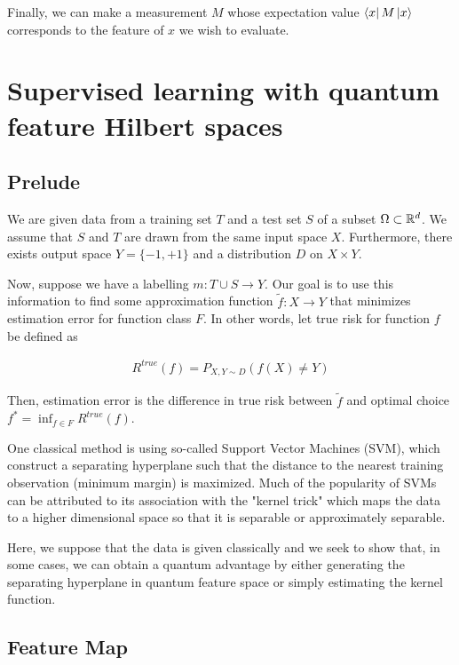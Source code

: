 \documentclass[main.tex]{subfiles}
\begin{document}
Finally, we can make a measurement $M$ whose expectation value $\bra{x}M\ket{x}$ corresponds to the feature of $x$ we wish to evaluate. 

\section{Supervised learning with quantum feature Hilbert spaces}
\cite{havlicek2018supervised}

\subsection{Prelude}

We are given data from a training set $T$ and a test set $S$ of a subset $\Omega \subset \mathbb{R}^d$. We assume that $S$ and $T$ are drawn from the same input space $X$. Furthermore, there exists output space $Y = \{ -1, +1 \} $ and a distribution $D$ on $X \times Y$.

Now, suppose we have a labelling $m: T \cup S \rightarrow Y$.  Our goal is to use this information to find some approximation function $\tilde{f} : X \rightarrow Y$ that minimizes estimation error for function class $F$. In other words, let true risk for function $f$ be defined as

\begin{align*}
R^{true}(f) = P_{X, Y \sim D}(f(X) \neq Y)	
\end{align*}

Then, estimation error is the difference in true risk between $\tilde{f}$ and optimal choice $f^* = \inf_{f \in F}R^{true}(f)$.

One classical method is using so-called Support Vector Machines (SVM), which construct a separating hyperplane such that the distance to the nearest training observation (minimum margin) is maximized. Much of the popularity of SVMs can be attributed to its association with the "kernel trick" which maps the data to a higher dimensional space so that it is separable or approximately separable.

Here, we suppose that the data is given classically and we seek to show that, in some cases, we can obtain a quantum advantage by either generating the separating hyperplane in quantum feature space or simply estimating the kernel function.

\subsection{Feature Map}
\end{document}

